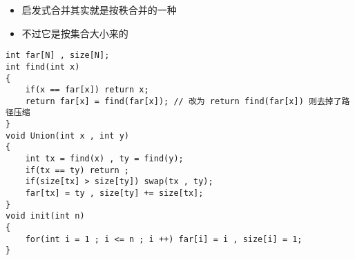 \documentclass[E:/GsjzTle/main/main.tex]{subfiles}
\begin{document}
\begin{itemize}
\item
  启发式合并其实就是按秩合并的一种
\item
  不过它是按集合大小来的
\end{itemize}

\begin{lstlisting}
int far[N] , size[N];
int find(int x)
{
	if(x == far[x]) return x;
	return far[x] = find(far[x]); // 改为 return find(far[x]) 则去掉了路径压缩
}
void Union(int x , int y)
{
	int tx = find(x) , ty = find(y);
	if(tx == ty) return ; 
	if(size[tx] > size[ty]) swap(tx , ty);
	far[tx] = ty , size[ty] += size[tx];
}
void init(int n)
{
	for(int i = 1 ; i <= n ; i ++) far[i] = i , size[i] = 1;
}
\end{lstlisting}
\end{document}
